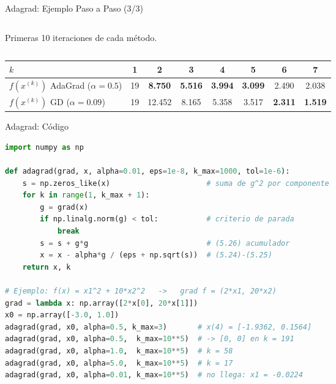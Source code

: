 \begin{frame}{Adagrad: Ejemplo Paso a Paso (3/3)}
\begin{columns}[T]
\begin{column}{0.46\textwidth}
            {\tiny Primeras 10 iteraciones de cada método.\par}
        \end{column}
    \end{columns}

    \vspace{0.1em}
    \centering
    {\scriptsize
    \begin{tabular}{l c c c c c c c}
        \toprule
        $k$ & 1 & 2 & 3 & 4 & 5 & 6 & 7 \\
        \midrule
        $f(x^{(k)})$ AdaGrad ($\alpha=0.5$) & 19 & \textbf{8.750} & \textbf{5.516} & \textbf{3.994} & \textbf{3.099} & 2.490 & 2.038 \\
        $f(x^{(k)})$ GD ($\alpha=0.09$) & 19 & 12.452 & 8.165 & 5.358 & 3.517 & \textbf{2.311} & \textbf{1.519} \\
        \bottomrule
    \end{tabular}\par}
\end{frame}

\begin{frame}[fragile]{Adagrad: Código}
\begin{lstlisting}[language=Python]
import numpy as np

def adagrad(grad, x, alpha=0.01, eps=1e-8, k_max=1000, tol=1e-6):
    s = np.zeros_like(x)                      # suma de g^2 por componente
    for k in range(1, k_max + 1):
        g = grad(x)
        if np.linalg.norm(g) < tol:           # criterio de parada
            break
        s = s + g*g                           # (5.26) acumulador
        x = x - alpha*g / (eps + np.sqrt(s))  # (5.24)-(5.25)
    return x, k

# Ejemplo: f(x) = x1^2 + 10*x2^2   ->   grad f = (2*x1, 20*x2)
grad = lambda x: np.array([2*x[0], 20*x[1]])
x0 = np.array([-3.0, 1.0])
adagrad(grad, x0, alpha=0.5, k_max=3)       # x(4) = [-1.9362, 0.1564]
adagrad(grad, x0, alpha=0.5,  k_max=10**5)  # -> [0, 0] en k = 191
adagrad(grad, x0, alpha=1.0,  k_max=10**5)  # k = 58
adagrad(grad, x0, alpha=5.0,  k_max=10**5)  # k = 17
adagrad(grad, x0, alpha=0.01, k_max=10**5)  # no llega: x1 = -0.0224
\end{lstlisting}
\end{frame}

